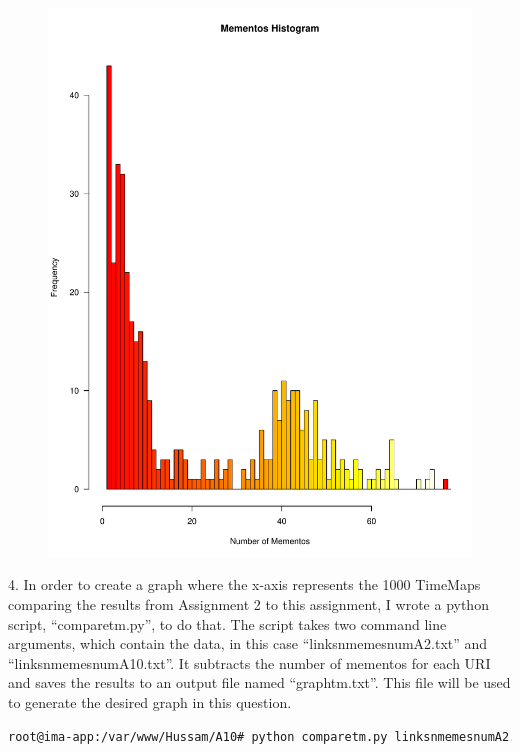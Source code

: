 \documentclass[a4paper, 11pt]{article}
\begin{document}
\begin{figure}[H]
\centering
\includegraphics[scale=0.7]{hist2.pdf}
\end{figure}
\pagebreak

4. In order to create a graph where the x-axis represents the 1000 TimeMaps comparing the results from Assignment 2 to this assignment, I wrote a python script, ``comparetm.py'', to do that. The script takes two command line arguments, which contain the data, in this case ``linksnmemesnumA2.txt'' and ``linksnmemesnumA10.txt''. It subtracts the number of mementos for each URI and saves the results to an output file named ``graphtm.txt''. This file will be used to generate the desired graph in this question.



\begin{lstlisting}[language=bash, breakatwhitespace=〈false), label=Command, caption=Running comparetm.py]
root@ima-app:/var/www/Hussam/A10# python comparetm.py linksnmemesnumA2.txt linksnmemesnumA10.txt
\end{lstlisting}
\end{document}
